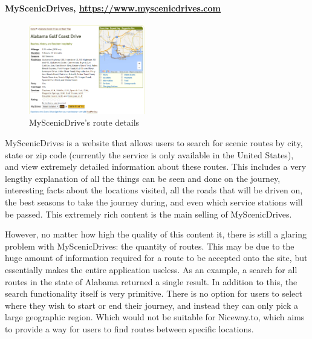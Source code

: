 \newpage 
\paragraph{MyScenicDrives, \url{https://www.myscenicdrives.com}}
\begin{figure}
	\vspace{1mm}
	\begin{center}
		\hspace{5mm}
		\includegraphics[width=0.45\textwidth]{images/background/msd_rdp.png}
	\end{center}
	\vspace{-6mm}
	\caption{MyScenicDrive's route details}	
	\vspace{-10mm}
\end{figure}
MyScenicDrives is a website that allows users to search for scenic routes by city, state or zip code (currently the service is only available in the United States), and view extremely detailed information about these routes. This includes a very lengthy explanation of all the things can be seen and done on the journey, interesting facts about the locations visited, all the roads that will be driven on, the best seasons to take the journey during, and even which service stations will be passed. This extremely rich content is the main selling of MyScenicDrives.

\vspace{5mm}
\noindent 
However, no matter how high the quality of this content it, there is still a glaring problem with MyScenicDrives: the quantity of routes. This may be due to the huge amount of information required for a route to be accepted onto the site, but essentially makes the entire application useless. As an example, a search for all routes in the state of Alabama returned a single result. In addition to this, the search functionality itself is very primitive. There is no option for users to select where they wish to start or end their journey, and instead they can only pick a large geographic region. Which would not be suitable for Niceway.to, which aims to provide a way for users to find routes between specific locations.
\ \\

